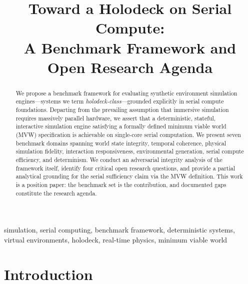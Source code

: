 \documentclass[conference]{IEEEtran}
\begin{document}
\title{Toward a Holodeck on Serial Compute:\\
A Benchmark Framework and Open Research Agenda}

\author{
}

\maketitle

\begin{abstract}
We propose a benchmark framework for evaluating synthetic environment simulation
engines---systems we term \textit{holodeck-class}---grounded explicitly in serial
compute foundations. Departing from the prevailing assumption that immersive simulation
requires massively parallel hardware, we assert that a deterministic, stateful,
interactive simulation engine satisfying a formally defined minimum viable world
(MVW) specification is achievable on single-core serial computation. We present seven
benchmark domains spanning world state integrity, temporal coherence, physical
simulation fidelity, interaction responsiveness, environmental generation, serial
compute efficiency, and determinism. We conduct an adversarial integrity analysis of
the framework itself, identify four critical open research questions, and provide a
partial analytical grounding for the serial sufficiency claim via the MVW definition.
This work is a position paper: the benchmark set is the contribution, and documented
gaps constitute the research agenda.
\end{abstract}

\begin{IEEEkeywords}
simulation, serial computing, benchmark framework, deterministic systems, virtual
environments, holodeck, real-time physics, minimum viable world
\end{IEEEkeywords}

\section{Introduction}
\end{document}
